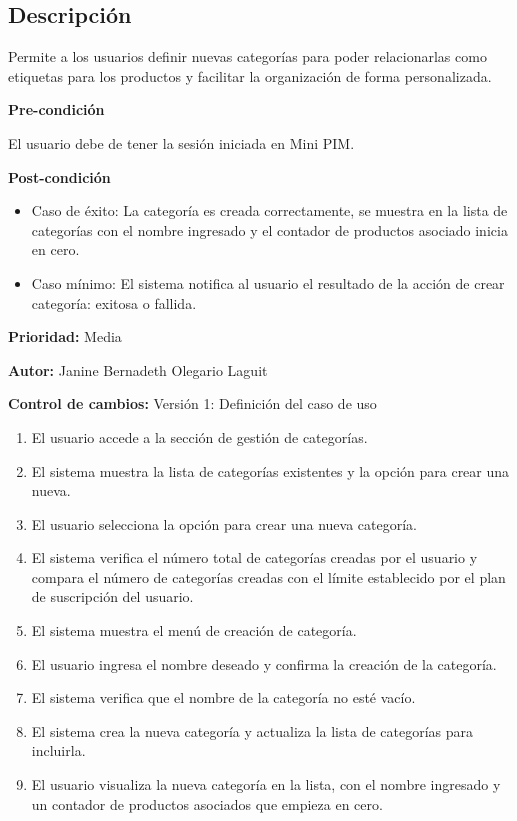{}

\subsection*{Descripción}
Permite a los usuarios definir nuevas categorías para poder relacionarlas como etiquetas para los productos y facilitar la organización de forma personalizada.\par
\vspace{0.15cm}

\textbf{Pre-condición}\par
El usuario debe de tener la sesión iniciada en Mini PIM. \par
\vspace{0.15cm}

\textbf{Post-condición}
\begin{itemize}
    \item Caso de éxito: La categoría es creada correctamente, se muestra en la lista de categorías con el nombre ingresado y el contador de productos asociado inicia en cero.
    \item Caso mínimo: El sistema notifica al usuario el resultado de la acción de crear categoría: exitosa o fallida.
\end{itemize}

\textbf{Prioridad: }
Media
\vspace{0.15cm}

\textbf{Autor: }
Janine Bernadeth Olegario Laguit\par
\vspace{0.15cm}

\textbf{Control de cambios: } Versión 1: Definición del caso de uso

\begin{enumerate}
    \item El usuario accede a la sección de gestión de categorías.
    \item El sistema muestra la lista de categorías existentes y la opción para crear una nueva.
    \item El usuario selecciona la opción para crear una nueva categoría.
    \item El sistema verifica el número total de categorías creadas por el usuario y compara el número de categorías creadas con el límite establecido por el plan de suscripción del usuario.
    \item El sistema muestra el menú de creación de categoría.
    \item El usuario ingresa el nombre deseado y confirma la creación de la categoría.
    \item El sistema verifica que el nombre de la categoría no esté vacío.
    \item El sistema crea la nueva categoría y actualiza la lista de categorías para incluirla.
    \item El usuario visualiza la nueva categoría en la lista, con el nombre ingresado y un contador de productos asociados que empieza en cero.
\end{enumerate}

